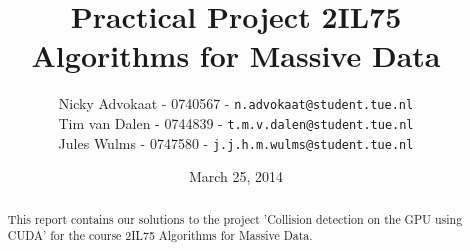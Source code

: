 \documentclass[a4paper,twoside,11pt]{article}
\title{\vspace{-\baselineskip}\sffamily\bfseries Practical Project 2IL75 \\ Algorithms for Massive Data }
\author{
Nicky Advokaat - 0740567 - {\tt n.advokaat@student.tue.nl} \\
Tim van Dalen - 0744839 - {\tt t.m.v.dalen@student.tue.nl}\\
Jules Wulms - 0747580 - {\tt j.j.h.m.wulms@student.tue.nl}\\
}
\date{March 25, 2014}
\numberwithin{equation}{section}
\begin{document}
\maketitle
\thispagestyle{empty}
\begin{abstract}
This report contains our solutions to the project  'Collision detection on the GPU using CUDA'  for the course 2IL75 Algorithms for Massive Data.
\end{abstract}










\end{document}
